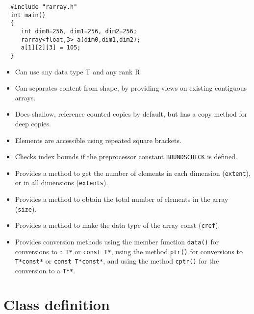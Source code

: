 \documentclass[12pt,twoside]{article}
\begin{document}
\begin{framed}\vspace{-14pt}%
\begin{verbatim}
  #include "rarray.h"
  int main() 
  {
     int dim0=256, dim1=256, dim2=256;
     rarray<float,3> a(dim0,dim1,dim2);
     a[1][2][3] = 105;
  }
\end{verbatim}%
\vspace{-14pt}%
\end{framed}

\begin{itemize}\itemsep0pt\parskip2pt
\item Can use any data type T and any rank R.
\item Can separates content from shape, by providing views on existing
  contiguous arrays.
\item Does shallow, reference counted copies by default, but has a
  copy method for deep copies.
\item Elements are accessible using repeated square brackets.
\item Checks index bounds if the preprocessor
  constant {\tt BOUNDSCHECK} is defined. 
\item Provides a method to get the number of elements in each
  dimension (\texttt{extent}), or in all dimensions (\texttt{extents}).
\item Provides  a method to obtain the total number of elements in the
  array (\texttt{size}).
\item Provides a method to make the data type of the array const
  (\texttt{cref}).
\item Provides conversion methods using the member
  function \texttt{data()} for conversions to a \texttt{T*} or
  \texttt{const T*}, using the method \texttt{ptr()} for
  conversions to \texttt{T*const*} or \texttt{const T*const*}, and
  using the method \texttt{cptr()} for the conversion to a
  \texttt{T**}.
\end{itemize}

\section{Class definition}
\end{document}
